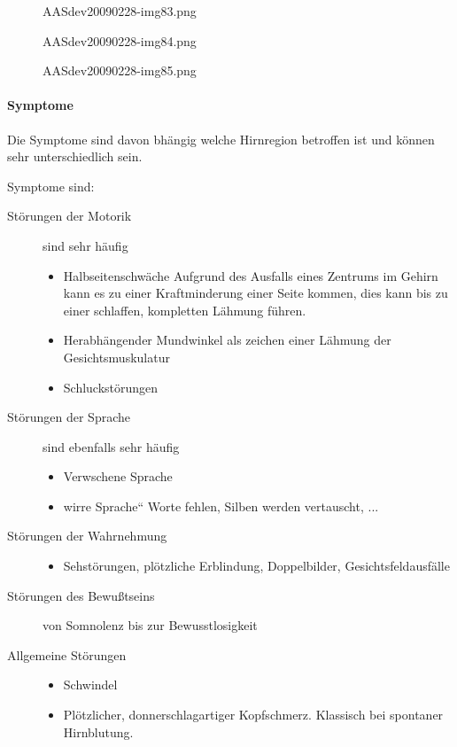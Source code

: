 \begin{figure}[h]
 [Warning: Image ignored] {AASdev20090228-img83.png} 
\end{figure}
\begin{figure}[h]
 [Warning: Image ignored] {AASdev20090228-img84.png}
\end{figure}
\begin{figure}[h]
    [Warning: Image ignored] [width=9.526cm,height=5.428cm]{AASdev20090228-img85.png}
\end{figure}

\paragraph{Symptome}

Die Symptome sind davon bhängig welche Hirnregion betroffen ist und 
können sehr unterschiedlich sein.

 Symptome sind:

\begin{description}
    \item[Störungen der Motorik] sind sehr häufig
    \begin{itemize}
        \item Halbseitenschwäche Aufgrund des Ausfalls eines Zentrums im Gehirn kann es zu einer Kraftminderung einer Seite kommen, dies kann bis zu einer schlaffen, kompletten Lähmung führen.
        \item Herabhängender Mundwinkel als zeichen einer Lähmung der Gesichtsmuskulatur
        \item Schluckstörungen
    \end{itemize}
    \item[Störungen der Sprache] sind ebenfalls sehr häufig
    \begin{itemize}
        \item Verwschene Sprache
        \item {\quotedblbase}wirre Sprache{\textquotedblleft} Worte fehlen, Silben
        werden vertauscht, ...
        
    \end{itemize}
    \item[Störungen der Wahrnehmung]
    \begin{itemize}
        \item Sehstörungen, plötzliche Erblindung, Doppelbilder,
        Gesichtsfeldausfälle
    \end{itemize}
    \item[Störungen des Bewußtseins] von Somnolenz bis zur Bewusstlosigkeit
    
    \item[Allgemeine Störungen]
    \begin{itemize}
        \item Schwindel
        \item Plötzlicher, donnerschlagartiger Kopfschmerz. Klassisch bei spontaner Hirnblutung.
    \end{itemize}
\end{description}

